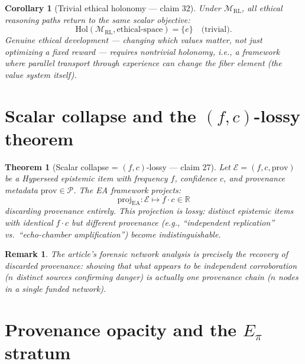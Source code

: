 \documentclass[11pt,a4paper]{article}
\newtheorem{theorem}[definition]{Theorem}
\newtheorem{corollary}[definition]{Corollary}
\newtheorem{remark}[definition]{Remark}
\begin{document}
\begin{corollary}[Trivial ethical holonomy --- claim 32]
Under $\mathcal{M}_{\text{RL}}$, all ethical reasoning paths return to
the same scalar objective:
\[
  \text{Hol}(\mathcal{M}_{\text{RL}}, \text{ethical-space}) = \{e\}
  \quad \text{(trivial)}.
\]
Genuine ethical development --- changing which values matter, not just
optimizing a fixed reward --- requires nontrivial holonomy, i.e., a
framework where parallel transport through experience can change the
fiber element (the value system itself).
\end{corollary}

\section{Scalar collapse and the $(f,c)$-lossy theorem}
\label{sec:scalar-collapse}

\begin{theorem}[Scalar collapse = $(f,c)$-lossy --- claim 27]
\label{thm:scalar-collapse}
Let $\mathcal{E} = (f, c, \text{prov})$ be a Hyperseed epistemic item
with frequency $f$, confidence $c$, and provenance metadata
$\text{prov} \in \mathcal{P}$. The EA framework projects:
\[
  \text{proj}_{\text{EA}} : \mathcal{E} \mapsto f \cdot c \in \mathbb{R}
\]
discarding provenance entirely. This projection is lossy: distinct
epistemic items with identical $f \cdot c$ but different provenance
(e.g., ``independent replication'' vs.\ ``echo-chamber amplification'')
become indistinguishable.
\end{theorem}

\begin{remark}
The article's forensic network analysis is precisely the recovery of
discarded provenance: showing that what appears to be independent
corroboration ($n$ distinct sources confirming danger) is actually
one provenance chain ($n$ nodes in a single funded network).
\end{remark}

\section{Provenance opacity and the $E_\pi$ stratum}
\label{sec:provenance}
\end{document}

